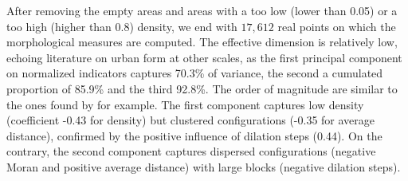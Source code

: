 \documentclass[letterpaper]{article}
\begin{document}
After removing the empty areas and areas with a too low (lower than 0.05) or a too high (higher than 0.8) density, we end with $17,612$ real points on which the morphological measures are computed. The effective dimension is relatively low, echoing literature on urban form at other scales, as the first principal component on normalized indicators captures 70.3\% of variance, the second a cumulated proportion of 85.9\% and the third 92.8\%. The order of magnitude are similar to the ones found by \cite{Schwarz201029} for example. The first component captures low density (coefficient -0.43 for density) but clustered configurations (-0.35 for average distance), confirmed by the positive influence of dilation steps (0.44). On the contrary, the second component captures dispersed configurations (negative Moran and positive average distance) with large blocks (negative dilation steps).






\end{document}
